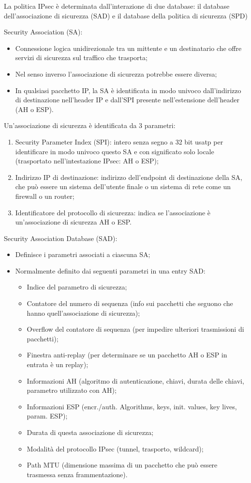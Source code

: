 La politica IPsec è determinata dall'interazione di due database: il database dell'associazione di sicurezza (SAD) e il database della politica di sicurezza (SPD)

Security Association (SA):
\begin{itemize}
    \item Connessione logica unidirezionale tra un mittente e un destinatario che offre servizi di sicurezza sul traffico che trasporta;
	\item Nel senso inverso l'associazione di sicurezza potrebbe essere diversa;
	\item In qualsiasi pacchetto IP, la SA è identificata in modo univoco dall'indirizzo di destinazione nell'header IP e dall'SPI presente nell'estensione dell'header (AH o ESP).
\end{itemize}

Un'associazione di sicurezza è identificata da 3 parametri:
\begin{enumerate}
    \item Security Parameter Index (SPI): intero senza segno a 32 bit usatp per identificare in modo univoco questo SA e con significato solo locale (trasportato nell'intestazione IPsec: AH o ESP);
	\item Indirizzo IP di destinazione: indirizzo dell'endpoint di destinazione della SA, che può essere un sistema dell'utente finale o un sistema di rete come un firewall o un router;
	\item Identificatore del protocollo di sicurezza: indica se l'associazione è un'associazione di sicurezza AH o ESP.
\end{enumerate}

Security Association Database (SAD):
\begin{itemize}
    \item Definisce i parametri associati a ciascuna SA;
	\item Normalmente definito dai seguenti parametri in una entry SAD: 
	\begin{itemize}
	    \item Indice del parametro di sicurezza;
		\item Contatore del numero di sequenza (info sui pacchetti che seguono che hanno quell'associazione di sicurezza);
		\item Overflow del contatore di sequenza (per impedire ulteriori trasmissioni di pacchetti);
		\item Finestra anti-replay (per determinare se un pacchetto AH o ESP in entrata è un replay);
		\item Informazioni AH (algoritmo di autenticazione, chiavi, durata delle chiavi, parametro utilizzato con AH);
		\item Informazioni ESP (encr./auth. Algorithms, keys, init. values, key lives, param. ESP);
		\item Durata di questa associazione di sicurezza;
		\item Modalità del protocollo IPsec (tunnel, trasporto, wildcard);
		\item Path MTU (dimensione massima di un pacchetto che può essere trasmessa senza frammentazione).
	\end{itemize}
\end{itemize}

